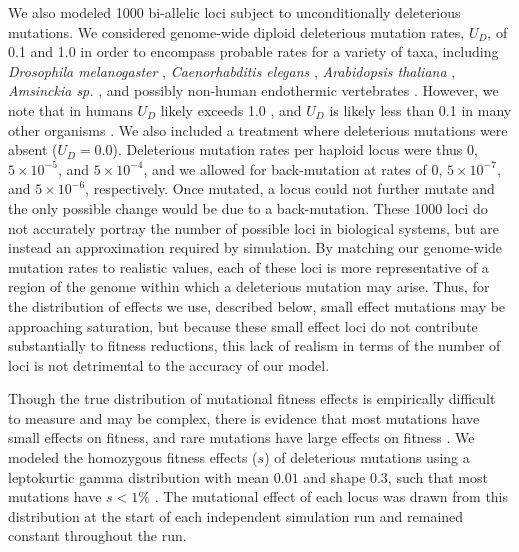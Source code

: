 We also modeled 1000 bi-allelic loci subject to unconditionally deleterious mutations. We considered genome-wide diploid deleterious mutation rates, $U_D$, of 0.1 and 1.0 in order to encompass probable rates for a variety of taxa, including \emph{Drosophila melanogaster} \citep{Haag:2007}, \emph{Caenorhabditis elegans} \citep{Denver:2004}, \emph{Arabidopsis thaliana} \citep{Shaw:2000}, \emph{Amsinckia sp.} \citep{Schoen:2005}, and possibly non-human endothermic vertebrates \citep{Baer:2007}. However, we note that in humans $U_D$ likely exceeds 1.0 \citep{Keightley:2012}, and $U_D$ is likely less than 0.1 in many other organisms \citep{Baer:2007, Halligan:2009}. We also included a treatment where deleterious mutations were absent ($U_D = 0.0$). Deleterious mutation rates per haploid locus were thus $0$, $5\times10^{-5}$, and $5\times10^{-4}$, and we allowed for back-mutation at rates of $0$, $5\times10^{-7}$, and $5\times10^{-6}$, respectively. Once mutated, a locus could not further mutate and the only possible change would be due to a back-mutation. These 1000 loci do not accurately portray the number of possible loci in biological systems, but are instead an approximation required by simulation. By matching our genome-wide mutation rates to realistic values, each of these loci is more representative of a region of the genome within which a deleterious mutation may arise. Thus, for the distribution of effects we use, described below, small effect mutations may be approaching saturation, but because these small effect loci do not contribute substantially to fitness reductions, this lack of realism in terms of the number of loci is not detrimental to the accuracy of our model. 

Though the true distribution of mutational fitness effects is empirically difficult to measure and may be complex, there is evidence that most mutations have small effects on fitness, and rare mutations have large effects on fitness \citep{Eyre:2007}. We modeled the homozygous fitness effects ($s$) of deleterious mutations using a leptokurtic gamma distribution with mean $0.01$ and shape $0.3$, such that most mutations have $s < 1\%$ \citep{Keightley:1994}. The mutational effect of each locus was drawn from this distribution at the start of each independent simulation run and remained constant throughout the run.

